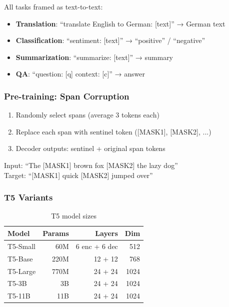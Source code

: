 All tasks framed as text-to-text:
\begin{itemize}
    \item \textbf{Translation}: ``translate English to German: [text]'' → German text
    \item \textbf{Classification}: ``sentiment: [text]'' → ``positive'' / ``negative''
    \item \textbf{Summarization}: ``summarize: [text]'' → summary
    \item \textbf{QA}: ``question: [q] context: [c]'' → answer
\end{itemize}

\subsubsection{Pre-training: Span Corruption}

\begin{enumerate}
    \item Randomly select spans (average 3 tokens each)
    \item Replace each span with sentinel token ([MASK1], [MASK2], ...)
    \item Decoder outputs: sentinel + original span tokens
\end{enumerate}

\begin{example}
Input: ``The [MASK1] brown fox [MASK2] the lazy dog''\\
Target: ``[MASK1] quick [MASK2] jumped over''
\end{example}

\subsubsection{T5 Variants}

\begin{table}[H]
\centering
\caption{T5 model sizes}
\begin{tabular}{lrrr}
\toprule
\textbf{Model} & \textbf{Params} & \textbf{Layers} & \textbf{Dim} \\
\midrule
T5-Small & 60M & 6 enc + 6 dec & 512 \\
T5-Base & 220M & 12 + 12 & 768 \\
T5-Large & 770M & 24 + 24 & 1024 \\
T5-3B & 3B & 24 + 24 & 1024 \\
T5-11B & 11B & 24 + 24 & 1024 \\
\bottomrule
\end{tabular}
\end{table}

